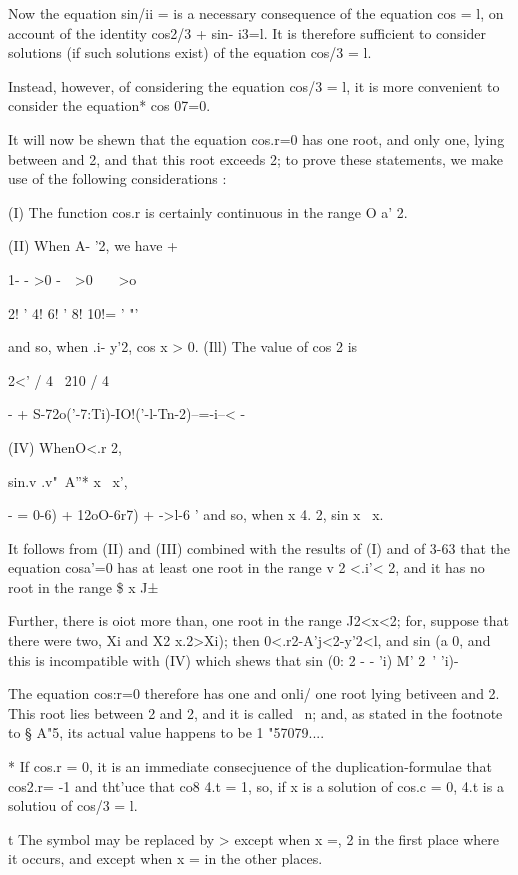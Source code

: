 Now the equation sin/ii = is a necessary consequence of the equation
cos = l, on account of the identity cos2/3 + sin- i3=l. It is
therefore sufficient to consider solutions (if such solutions exist)
of the equation cos/3 = l.

Instead, however, of considering the equation cos/3 = l, it is more
convenient to consider the equation* cos 07=0.

It will now be shewn that the equation cos.r=0 has one root, and only
one, lying between and 2, and that this root exceeds 2; to prove
these statements, we make use of the following considerations :

(I) The function cos.r is certainly continuous in the range O a' 2.

(II) When A- '2, we have +

1- - >0 -\ \ >0 \ \ \ >o

2! ' 4! 6! ' 8! 10!= ' "'

and so, when .i- y'2, cos x > 0. (Ill) The value of cos 2 is

2<' / 4 \ 210 / 4 \

- + S-72o('-7:Ti)-IO!('-l-Tn-2)--=-i--< -

(IV) WhenO<.r 2,

sin.v .v"\ A''* x \, x',

- = 0-6) + 12oO-6r7) + ->l-6 ' and so, when x 4. 2, sin x \ x.

It follows from (II) and (III) combined with the results of (I) and of
3-63 that the equation cosa'=0 has at least one root in the range v 2
<.i'< 2, and it has no root in the range \$ x J±

Further, there is oiot more than, one root in the range J2<x<2; for,
suppose that there were two, Xi and X2 x.2>Xi); then
0<.r2-A'j<2-y'2<l, and sin (a%
0, and this is incompatible with (IV) which shews that sin (0: 2 - -
'i) M' 2~' 'i)-

The equation cos:r=0 therefore has one and onli/ one root lying
betiveen and 2. This root lies between 2 and 2, and it is called \ n;
and, as stated in the footnote to § A"5, its actual value happens to
be 1 "57079....

* If cos.r = 0, it is an immediate consecjuence of the
duplication-formulae that cos2.r= -1 and tht'uce that co8 4.t = 1, so,
if x is a solution of cos.c = 0, 4.t is a solutiou of cos/3 = l.

t The symbol may be replaced by > except when x =, 2 in the first
place where it occurs, and except when x = in the other places.

